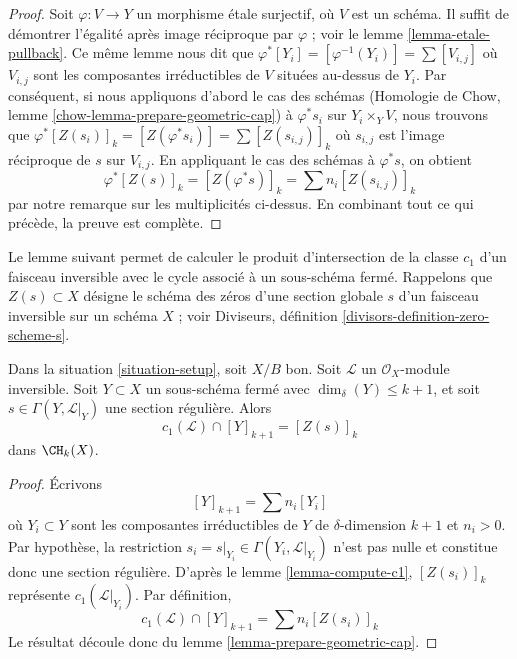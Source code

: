 \begin{proof}
Soit $\varphi : V \to Y$ un morphisme \'etale surjectif, où $V$ est un schéma.
Il suffit de démontrer l'égalité après image réciproque par $\varphi$ ; voir le lemme
\ref{lemma-etale-pullback}. Ce même lemme nous dit que $\varphi^*[Y_i] =
[\varphi^{-1}(Y_i)] = \sum [V_{i, j}]$ où $V_{i, j}$ sont les composantes
irréductibles de $V$ situées au-dessus de $Y_i$. Par conséquent, si nous
appliquons d'abord le cas des schémas (Homologie de Chow, lemme
\ref{chow-lemma-prepare-geometric-cap}) à $\varphi^*s_i$ sur $Y_i \times_Y V$,
nous trouvons que $\varphi^*[Z(s_i)]_k = [Z(\varphi^*s_i)] = \sum [Z(s_{i,
j})]_k$ où $s_{i, j}$ est l'image réciproque de $s$ sur $V_{i, j}$. En
appliquant le cas des schémas à $\varphi^*s$, on obtient
$$
\varphi^*[Z(s)]_k =
[Z(\varphi^*s)]_k =
\sum n_i[Z(s_{i, j})]_k
$$
par notre remarque sur les multiplicités ci-dessus. En combinant tout ce qui
précède, la preuve est complète.
\end{proof}

\noindent
Le lemme suivant permet de calculer le produit d'intersection de la classe
$c_1$ d'un faisceau inversible avec le cycle associé à un sous-schéma fermé.
Rappelons que $Z(s) \subset X$ désigne le schéma des zéros d'une section globale $s$
d'un faisceau inversible sur un schéma $X$ ; voir Diviseurs, définition
\ref{divisors-definition-zero-scheme-s}.

\begin{lemma}
\label{lemma-geometric-cap}
Dans la situation \ref{situation-setup}, soit $X/B$ bon. Soit
$\mathcal{L}$ un $\mathcal{O}_X$-module inversible. Soit $Y \subset X$ un
sous-schéma fermé avec $\dim_\delta(Y) \leq k + 1$, et soit $s \in \Gamma(Y,
\mathcal{L}|_Y)$ une section régulière. Alors
$$
c_1(\mathcal{L}) \cap [Y]_{k + 1} = [Z(s)]_k
$$
dans $\CH_k(X)$.
\end{lemma}

\begin{proof}
Écrivons
$$
[Y]_{k + 1} = \sum n_i[Y_i]
$$
où $Y_i \subset Y$ sont les composantes irréductibles de $Y$ de $\delta$-dimension $k + 1$ et $n_i > 0$. Par hypothèse, la restriction $s_i = s|_{Y_i}
\in \Gamma(Y_i, \mathcal{L}|_{Y_i})$ n'est pas nulle et constitue donc une
section régulière. D'après le lemme \ref{lemma-compute-c1},
$[Z(s_i)]_k$ représente $c_1(\mathcal{L}|_{Y_i})$. Par définition,
$$
c_1(\mathcal{L}) \cap [Y]_{k + 1} = \sum n_i[Z(s_i)]_k
$$
Le résultat découle donc du lemme \ref{lemma-prepare-geometric-cap}.
\end{proof}









